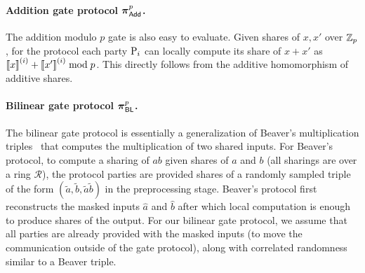 \paragraph{Addition gate protocol $\boldsymbol{\pi}_{\textnormal{\textsf{Add}}}^{p}$.}
The addition modulo $p$ gate is also easy to evaluate. Given shares of $x, x'$ over $\mathbb{Z}_p$, for the protocol each party $\textnormal{P}_i$ can locally compute its share of $x+x'$ as $\left\llbracket x \right\rrbracket^{(i)} + \left\llbracket x' \right\rrbracket^{(i)} \bmod p$. This directly follows from the additive homomorphism of additive shares. 



\paragraph{Bilinear gate protocol $\boldsymbol{\pi}_{\textnormal{\textsf{BL}}}^p$.}
The bilinear gate protocol is essentially a generalization of Beaver's multiplication triples~\cite{boyle2019-fss-preprocess,beaver1991-triples} that computes the multiplication of two shared inputs. For Beaver's protocol, to compute a sharing of $ab$ given shares of $a$ and $b$ (all sharings are over a ring $\mathcal{R}$), the protocol parties are provided shares of a randomly sampled triple of the form $(\tilde{a},\tilde{b},\tilde{a}\tilde{b})$ in the preprocessing stage. Beaver's protocol first reconstructs the masked inputs $\hat{a}$ and $\hat{b}$ after which local computation is enough to produce shares of the output. For our bilinear gate protocol, we assume that  all parties are already provided with the masked inputs (to move the communication outside of the gate protocol), along with correlated randomness similar to a Beaver triple. 

